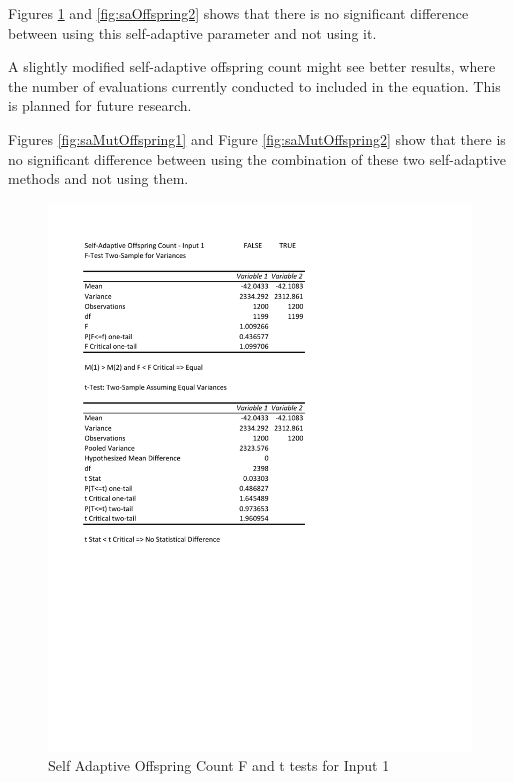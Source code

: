\documentclass[times]{article}
\begin{document}
	Figures \ref{fig:saOffspring1} and \ref{fig:saOffspring2} shows that there is no significant difference between using this self-adaptive parameter and not using it. 

	A slightly modified self-adaptive offspring count might see better results, where the number of evaluations currently conducted to included in the equation. This is planned for future research.

	Figures \ref{fig:saMutOffspring1} and Figure \ref{fig:saMutOffspring2} show that there is no significant difference between using the combination of these two self-adaptive methods and not using them.

	\begin{figure}
		\caption{Self Adaptive Offspring Count F and t tests for Input 1}
		\label{fig:saOffspring1}
		\includegraphics[width=\textwidth]{./t_test/S-AOffspringCount1}
	\end{figure}
\end{document}
